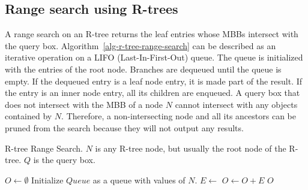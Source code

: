 
\subsection{Range search using R-trees}

A range search on an R-tree returns the leaf entries whose MBBs intersect with the query box. Algorithm~\ref{alg-r-tree-range-search} can be described as an iterative operation on a LIFO (Last-In-First-Out) queue. The queue is initialized with the entries of the root node. Branches are dequeued until the queue is empty. If the dequeued entry is a leaf node entry, it is made part of the result. If the entry is an inner node entry, all its children are enqueued. A query box that does not intersect with the MBB of a node \(N\) cannot intersect with any objects contained by \(N\). Therefore, a non-intersecting node and all its ancestors can be pruned from the search because they will not output any results.

\begin{algorithm}
  \caption{R-tree Range Search. \(N\) is any R-tree node, but usually the root node of the R-tree. \(Q\) is the query box.}
  \label{alg-r-tree-range-search}
  \begin{algorithmic}[1]
      \State \(O \leftarrow \emptyset\)
      \State Initialize \(Queue\) as a queue with values of \(N\).
        \State \(E \leftarrow\) 
            \State \(O \leftarrow O + E\)
          \Else
              \State {}
            \EndFor
          \EndIf
        \EndIf
      \EndWhile
      \State \Return \(O\)
    \EndFunction
  \end{algorithmic}
\end{algorithm}

